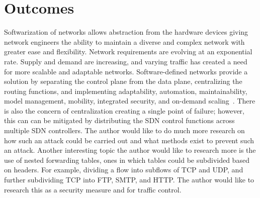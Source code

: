 \documentclass[11pt]{article}
\begin{document}
\section{Outcomes}

Softwarization of networks allows abstraction from the hardware devices giving network engineers the ability to maintain a diverse and complex network with greater ease and flexibility. Network requirements are evolving at an exponential rate. Supply and demand are increasing, and varying traffic has created a need for more scalable and adaptable networks. Software-defined networks provide a solution by separating the control plane from the data plane, centralizing the routing functions, and implementing adaptability, automation, maintainability, model management, mobility, integrated security, and on-demand scaling~\cite{Kurose}. There is also the concern of centralization creating a single point of failure; however, this can can be mitigated by distributing the SDN control functions across multiple SDN controllers. The author would like to do much more research on how such an attack could be carried out and what methods exist to prevent such an attack. Another interesting topic the author would like to research more is the use of nested forwarding tables, ones in which tables could be subdivided based on headers. For example, dividing a flow into subflows of TCP and UDP, and further subdividing TCP into FTP, SMTP, and HTTP. The author would like to research this as a security measure and for traffic control.

\newpage



\end{document}
